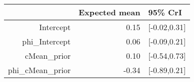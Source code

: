 \begin{tabular}{rrl}
  \hline
 & Expected mean & 95\% CrI \\ 
  \hline
Intercept & 0.15 & [-0.02,0.31] \\ 
  phi\_Intercept & 0.06 & [-0.09,0.21] \\ 
  cMean\_prior & 0.10 & [-0.54,0.73] \\ 
  phi\_cMean\_prior & -0.34 & [-0.89,0.21] \\ 
   \hline
\end{tabular}

